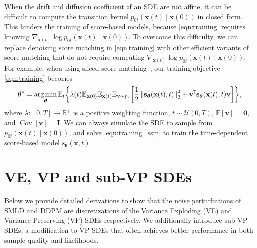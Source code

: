 \documentclass{article} %
\newcommand*{\tran}{^{\mkern-1.5mu\mathsf{T}}}
\newcommand{\mbb}[1]{\mathbb{#1}}
\newcommand{\mcal}{\mathcal}
\newcommand{\norm}[1]{\left\lVert#1\right\rVert}
\DeclareMathOperator*{\argmin}{arg\,min}
\newcommand{\bfx}{\mathbf{x}}
\newcommand{\bfv}{\mathbf{v}}
\newcommand{\bfI}{\mathbf{I}}
\newcommand{\bfzero}{\mathbf{0}}
\newcommand{\bftheta}{{\boldsymbol{\theta}}}
\newcommand{\bfs}{\mathbf{s}}
\begin{document}
When the drift and diffusion coefficient of an SDE are not affine, it can be difficult to compute the transition kernel $p_{0t}(\bfx(t) \mid \bfx(0))$ in closed form. This hinders the training of score-based models, because \cref{eqn:training} requires knowing $\nabla_{\bfx(t)}\log p_{0t}(\bfx(t) \mid \bfx(0))$. To overcome this difficulty, we can replace denoising score matching in \cref{eqn:training} with other efficient variants of score matching that do not require computing $\nabla_{\bfx(t)}\log p_{0t}(\bfx(t) \mid \bfx(0))$. For example, when using sliced score matching~\citep{song2019sliced}, our training objective \cref{eqn:training} becomes
\begin{align}
   \bftheta^* = \argmin_\bftheta 
   \mbb{E}_{t}\bigg\{\lambda(t) \mbb{E}_{\bfx(0)}\mbb{E}_{\bfx(t) }\mbb{E}_{\bfv \sim p_\bfv}
   \bigg[\frac{1}{2}\norm{\bfs_\bftheta(\bfx(t), t)}_2^2 + \bfv\tran \bfs_\bftheta(\bfx(t), t) \bfv \bigg]\bigg\}%
   , \label{eqn:training_ssm}
\end{align}
where $\lambda: [0,T] \to \mbb{R}^+$ is a positive weighting function, $t \sim \mcal{U}(0, T)$, $\mbb{E}[\bfv] = \bfzero$, and $\operatorname{Cov}[\bfv] = \bfI$. We can always simulate the SDE to sample from $p_{0t}(\bfx(t) \mid \bfx(0))$, and solve \cref{eqn:training_ssm} to train the time-dependent score-based model $\bfs_\bftheta(\bfx, t)$.




\section{VE, VP and sub-VP SDEs}\label{app:sde_derive}
Below we provide detailed derivations to show that the noise perturbations of SMLD and DDPM are discretizations of the Variance Exploding (VE) and Variance Preserving (VP) SDEs respectively. We additionally introduce sub-VP SDEs, a modification to VP SDEs that often achieves better performance in both sample quality and likelihoods.
\end{document}
